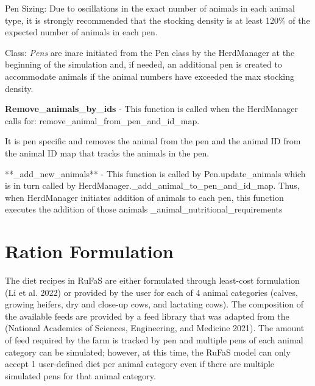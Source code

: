 \documentclass[
  letterpaper,
  oneside,
  openany]{scrbook}
\begin{document}
Pen Sizing: Due to oscillations in the exact number of animals in each
animal type, it is strongly recommended that the stocking density is at
least 120\% of the expected number of animals in each pen.

Class: \emph{Pens} are inare initiated from the Pen class by the
HerdManager at the beginning of the simulation and, if needed, an
additional pen is created to accommodate animals if the animal numbers
have exceeded the max stocking density.

\begin{tcolorbox}[enhanced jigsaw, arc=.35mm, bottomrule=.15mm, bottomtitle=1mm, breakable, colback=white, colbacktitle=quarto-callout-note-color!10!white, colframe=quarto-callout-note-color-frame, coltitle=black, left=2mm, leftrule=.75mm, opacityback=0, opacitybacktitle=0.6, rightrule=.15mm, title=\textcolor{quarto-callout-note-color}{\faInfo}\hspace{0.5em}{Note}, titlerule=0mm, toprule=.15mm, toptitle=1mm]

\textbf{Remove\_animals\_by\_ids} - This function is called when the
HerdManager calls for: remove\_animal\_from\_pen\_and\_id\_map.

It is pen specific and removes the animal from the pen and the animal ID
from the animal ID map that tracks the animals in the pen.

**\_add\_new\_animals** - This function is called by Pen.update\_animals
which is in turn called by
HerdManager.\_add\_animal\_to\_pen\_and\_id\_map. Thus, when HerdManager
initiates addition of animals to each pen, this function executes the
addition of those animals \_animal\_nutritional\_requirements

\end{tcolorbox}

\section{Ration Formulation}\label{ration-formulation}

The diet recipes in RuFaS are either formulated through least-cost
formulation (Li et al. 2022) or provided by the user for each of 4
animal categories (calves, growing heifers, dry and close-up cows, and
lactating cows). The composition of the available feeds are provided by
a feed library that was adapted from the (National Academies of
Sciences, Engineering, and Medicine 2021). The amount of feed required
by the farm is tracked by pen and multiple pens of each animal category
can be simulated; however, at this time, the RuFaS model can only accept
1 user-defined diet per animal category even if there are multiple
simulated pens for that animal category.
\end{document}
